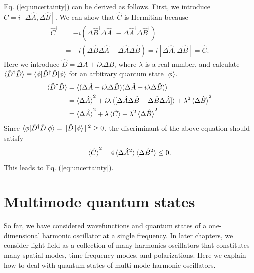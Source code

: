 Eq. (\ref{eq:uncertainty}) can be derived as follows. First, we introduce $\hat C = i[\Delta \hat A, \Delta \hat B]$. We can show that $\hat C$ is Hermitian because
\begin{equation}
\begin{aligned}
  \hat C^\dagger &= -i(\Delta \hat B^\dagger \Delta \hat A^\dagger - \Delta \hat A^\dagger \Delta \hat B^\dagger) \\ 
  &= -i(\Delta \hat B \Delta \hat A - \Delta \hat A \Delta \hat B) = i[\Delta \hat A, \Delta \hat B] = \hat C.
\end{aligned}
\end{equation}
Here we introduce $\hat D = \Delta A + i\lambda \Delta B$, where $\lambda$ is a real number, and calculate $\braket{\hat D^\dagger \hat D} \equiv \braket{\phi | \hat D^\dagger \hat D| \phi}$ for an arbitrary quantum state $\ket \phi$. 
\begin{equation}
  \begin{aligned}
  	\braket{\hat D^\dagger \hat D} &= \braket{(\Delta \hat A - i\lambda\Delta \hat B)(\Delta \hat A + i\lambda\Delta \hat B)} \\
  	&= \braket{\Delta \hat A}^2  + i\lambda\braket{[\Delta \hat A\Delta \hat B - \Delta \hat B \Delta \hat A]} + \lambda^2 \braket{\Delta \hat B}^2\\
  	&= \braket{\Delta \hat A}^2  + \lambda\braket{\hat C} + \lambda^2 \braket{\Delta \hat B}^2\\
  \end{aligned}
\end{equation}
Since $\braket{\phi|\hat D^\dagger\hat D|\phi} = \|\hat D\ket \phi \|^2\geq 0$, the discriminant of the above equation should satisfy
\begin{equation}
  \braket{\hat C}^2 - 4\braket{\Delta \hat A^2}\braket{\Delta \hat B^2} \leq 0.
\end{equation}
This leads to Eq. (\ref{eq:uncertainty}).

\section{Multimode quantum states}
So far, we have considered wavefunctions and quantum states of a one-dimensional harmonic oscillator at a single frequency. In later chapters, we consider light field as a collection of many harmonics oscillators that constitutes many spatial modes, time-frequency modes, and polarizations. Here we explain how to deal with quantum states of multi-mode harmonic oscillators.

